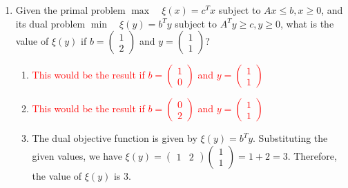 \documentclass{article}%
\newcommand{\incorrect}[1]{\textcolor{red}{#1}}
\begin{document}
\begin{enumerate}
\begin{enumerate}
\item \incorrect{This statement is partially correct in that if the primal is unbounded, the dual is infeasible, and vice versa. However, it doesn't encompass the full meaning of weak duality, which also applies when both problems are feasible and bounded.}%
\item \incorrect{This statement is incorrect. Weak duality states that the optimal objective function value of the primal problem is less than or equal to the optimal objective function value of the dual problem.}%
\item \incorrect{This statement is incorrect. Weak duality applies to both linear programs with equality and inequality constraints.}%
\end{enumerate}%
\vspace{1em}%
\item Given the primal problem $\max \quad \xi(x) = c^T x$ subject to $Ax \le b, x \ge 0$, and its dual problem $\min \quad \xi(y) = b^T y$ subject to $A^T y \ge c, y \ge 0$, what is the value of $\xi(y)$ if $b = \begin{pmatrix} 1 \\ 2 \end{pmatrix}$ and $y = \begin{pmatrix} 1 \\ 1 \end{pmatrix}$?%
\begin{enumerate}%
\item \incorrect{This would be the result if $b = \begin{pmatrix} 1 \\ 0 \end{pmatrix}$ and $y = \begin{pmatrix} 1 \\ 1 \end{pmatrix}$}%
\item \incorrect{This would be the result if $b = \begin{pmatrix} 0 \\ 2 \end{pmatrix}$ and $y = \begin{pmatrix} 1 \\ 1 \end{pmatrix}$}%
\item The dual objective function is given by $\xi(y) = b^T y$. Substituting the given values, we have $\xi(y) = \begin{pmatrix} 1 & 2 \end{pmatrix} \begin{pmatrix} 1 \\ 1 \end{pmatrix} = 1 + 2 = 3$. Therefore, the value of $\xi(y)$ is 3.%

\end{enumerate}
\end{enumerate}
\end{document}
